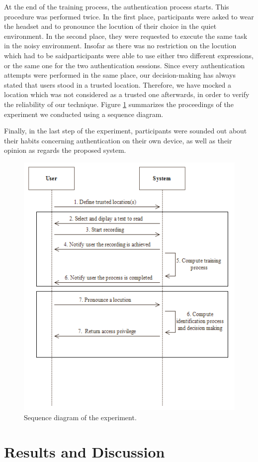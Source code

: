 \documentclass[cryptography,article,submit,moreauthors,pdftex,10pt,a4paper]{mdpi}
\begin{document}
At the end of the training process, the authentication process starts. This procedure was performed twice. In the first place, participants were asked to wear the headset and to pronounce the locution of their choice in the quiet environment. In the second place, they were requested to execute the same task in the noisy environment. Insofar as there was no restriction on the locution which had to be said\textemdash participants were able to use either two different expressions, or the same one for the two authentication sessions. Since every authentication attempts were performed in the same place, our decision-making has always stated that users stood in a trusted location. Therefore, we have mocked a location which was not considered as a trusted one afterwards, in order to verify the reliability of our technique. Figure \ref{fig:8} summarizes the proceedings of the experiment we conducted using a sequence diagram.

Finally, in the last step of the experiment, participants were sounded out about their habits concerning authentication on their own device, as well as their opinion as regards the proposed system.

\begin{figure}[H]
	\centering
	\includegraphics[width=10 cm]{8.png}
	\caption{Sequence diagram of the experiment.}
	\label{fig:8}
\end{figure}

\section{Results and Discussion}
\end{document}
